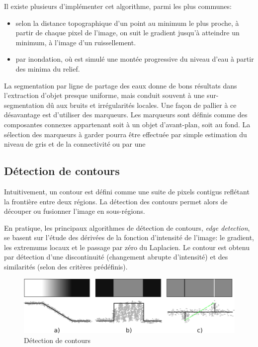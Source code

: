 \documentclass[a4paper,12pt]{report}
\begin{document}
Il existe plusieurs d'implémenter cet algorithme, parmi les plus communes: 
\begin{itemize}
\item selon la distance topographique d'un point au minimum le plus proche, à partir de chaque pixel de l'image, on suit le gradient jusqu'à atteindre un minimum, à l'image d'un ruissellement.
\item par inondation, où est simulé une montée progressive du niveau d'eau à partir des minima du relief.\\
\end{itemize}

La segmentation par ligne de partage des eaux donne de bons résultats dans l'extraction d'objet presque uniforme, mais conduit souvent à une sur-segmentation dû aux bruits et irrégularités locales. Une façon de pallier à ce désavantage est d'utiliser des marqueurs. Les marqueurs sont définis comme des composantes connexes appartenant soit à un objet d'avant-plan, soit au fond. La sélection des marqueurs à garder pourra être effectuée par simple estimation du niveau de gris et de la connectivité ou par une   


\subsection{Détection de contours}
Intuitivement, un contour est défini comme une suite de pixels contigus reflétant la frontière entre deux régions. 
La détection des contours permet alors de découper ou fusionner l'image en sous-régions.

En pratique, les principaux algorithmes de détection de contours, \textit{edge detection}, se basent sur l'étude des dérivées de la fonction d'intensité de l'image: le gradient, les extremums locaux et le passage par zéro du Laplacien. Le contour est obtenu par détection d'une discontinuité (changement abrupte d'intensité) et des similarités (selon des critères prédéfinis).\\

\begin{figure}[hbtp]
\centering
\includegraphics[scale=0.6]{figureDetectionDiscontinuities.png}
\caption{Détection de contours}
\label{fig:DetectionDiscontinuities}
\end{figure}
\end{document}
